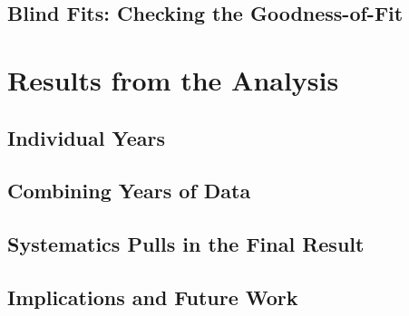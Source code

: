 \label{subsec:blind_fits}
\subsection{Blind Fits: Checking the Goodness-of-Fit}

\label{section:tau_results}
\section{Results from the Analysis}

\label{subsec:single_year_results}
\subsection{Individual Years}

\label{subsec:multi_year_results}
\subsection{Combining Years of Data}

\label{subsec:systematics_result}
\subsection{Systematics Pulls in the Final Result}

\label{subsec:implications}
\subsection{Implications and Future Work}
